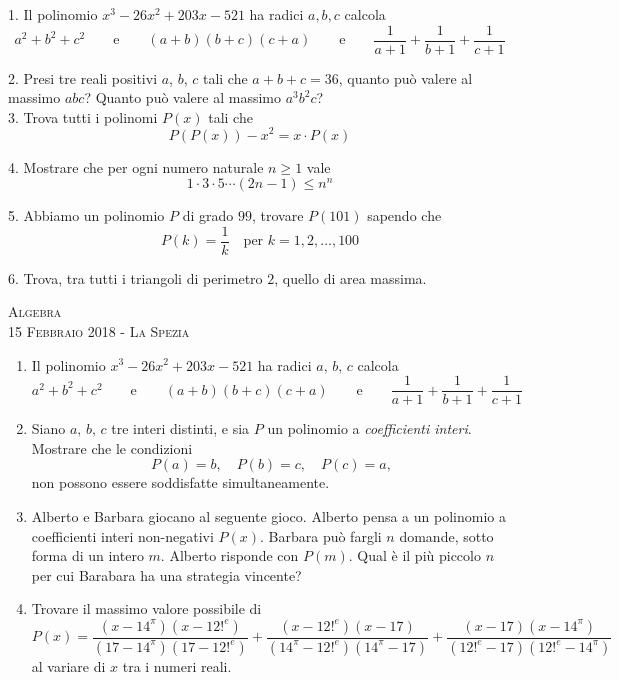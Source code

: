 \documentclass[a4paper]{article}
\theoremstyle{remark}
\theoremstyle{definition}
\begin{document}
1. Il polinomio $ x^3 -26x^2 + 203x - 521 $ ha radici $a, b, c$ calcola 
\[ a^2 + b^2 + c^2 \qquad\text{e}\qquad (a+b)(b+c)(c+a) \qquad\text{e}\qquad \frac{1}{a+1}+\frac{1}{b+1}+\frac{1}{c+1}\]

2. Presi tre reali positivi $a$, $b$, $c$ tali che $a+b+c = 36$, quanto può valere al massimo $abc$? Quanto può valere al massimo $a^3b^2c$? \\

3. Trova tutti i polinomi $ P(x) $ tali che
\[ P(P(x)) - x^2 = x\cdot P(x) \]

4. Mostrare che per ogni numero naturale $ n \geq 1 $ vale
\[ 1 \cdot 3 \cdot 5 \cdots (2n-1) \leq n^n \]

5. Abbiamo un polinomio $ P $ di grado $ 99 $, trovare $ P(101) $ sapendo che
\[ P(k) = \frac{1}{k} \quad \text{per } k = 1, 2, \dots, 100 \]

6. Trova, tra tutti i triangoli di perimetro $2$, quello di area massima. \\

\newpage
\begin{center}
	\vspace*{0,5 cm}
	{\Huge \textsc{Algebra}} \\
	\vspace{0,5 cm}
	\textsc{\Author} \hspace{1cm} \textsc{15 Febbraio 2018 - La Spezia}
	\thispagestyle{empty}
	\vspace{0,7 cm}
\end{center}
\normalsize

\begin{enumerate}
	\item  Il polinomio $ x^3 -26x^2 + 203x - 521 $ ha radici $a,\, b,\, c$ calcola 
	\[ a^2 + b^2 + c^2 \qquad\text{e}\qquad (a+b)(b+c)(c+a) \qquad\text{e}\qquad \frac{1}{a+1}+\frac{1}{b+1}+\frac{1}{c+1}\]
	
	\item Siano $ a,\, b,\, c $ tre interi distinti, e sia $ P $ un polinomio a \emph{coefficienti interi}. Mostrare che le condizioni $$  P(a) = b,\quad P(b) = c,\quad P(c) = a,  $$ non possono essere soddisfatte simultaneamente.

	\item Alberto e Barbara giocano al seguente gioco. Alberto pensa a un polinomio a coefficienti interi non-negativi $ P(x) $. Barbara può fargli $ n $ domande, sotto forma di un intero $ m $. Alberto risponde con $ P(m) $. Qual è il più piccolo $ n $ per cui Barabara ha una strategia vincente?
	
	\item  Trovare il massimo valore possibile di
	\[ P(x) = \frac{(x-14^\pi)(x-12!^e)}{(17-14^\pi)(17-12!^e)} 
	+\frac{(x-12!^e)(x-17)}{(14^\pi-12!^e)(14^\pi-17)} +\frac{(x-17)(x-14^\pi)}{(12!^e-17)(12!^e-14^\pi)} \]
	al variare di $ x $ tra i numeri reali.
	
\end{enumerate}
\end{document}
